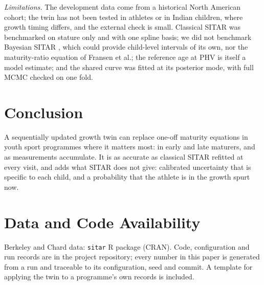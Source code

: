 \documentclass[journal]{IEEEtran}
\begin{document}
\emph{Limitations.} The development data come from a historical North American cohort; the twin has
not been tested in athletes or in Indian children, where growth timing differs, and the external
check is small. Classical SITAR was benchmarked on stature only and with one spline basis; we did
not benchmark Bayesian SITAR \cite{bsitar}, which could provide child-level intervals of its own,
nor the maturity-ratio equation of Fransen et al.; the reference age at PHV is itself a model
estimate; and the shared curve was fitted at its posterior mode, with full MCMC checked on one
fold.

\section{Conclusion}
A sequentially updated growth twin can replace one-off maturity equations in youth sport programmes
where it matters most: in early and late maturers, and as measurements accumulate. It is as accurate
as classical SITAR refitted at every visit, and adds what SITAR does not give: calibrated
uncertainty that is specific to each child, and a probability that the athlete is in the growth
spurt now.

\section*{Data and Code Availability}
Berkeley and Chard data: \texttt{sitar} R package (CRAN). Code, configuration and run records are in
the project repository; every number in this paper is generated from a run and traceable to its
configuration, seed and commit. A template for applying the twin to a programme's own records is
included.



\end{document}
